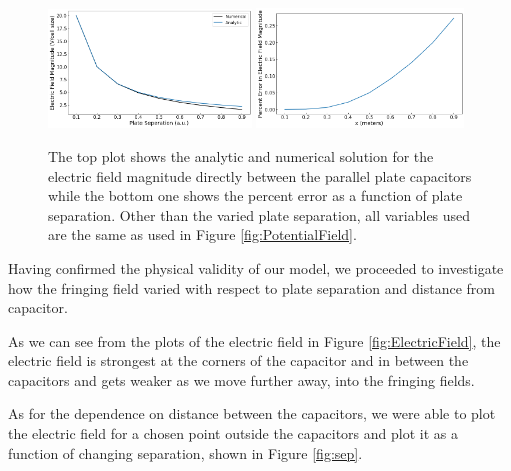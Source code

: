 \documentclass{report}
\begin{document}
            \begin{figure}[t]
                \centering
                \includegraphics[width=0.48\textwidth]{images/NumericalAnalytic.png}
                \includegraphics[width=0.49\textwidth]{images/PercentErrorSep.png}
                \caption{The top plot shows the analytic and numerical solution for the electric field magnitude directly between the parallel plate capacitors while the bottom one shows the percent error as a function of plate separation. Other than the varied plate separation, all variables used are the same as used in Figure \ref{fig:PotentialField}.}
                \label{fig:compare}
            \end{figure}
            
            Having confirmed the physical validity of our model, we proceeded to investigate how the fringing field varied with respect to plate separation and distance from capacitor.
        
            As we can see from the plots of the electric field in Figure \ref{fig:ElectricField}, the electric field is strongest at the corners of the capacitor and in between the capacitors and gets weaker as we move further away, into the fringing fields. 
            
            As for the dependence on distance between the capacitors, we were able to plot the electric field for a chosen point outside the capacitors and plot it as a function of changing separation, shown in Figure \ref{fig:sep}.
            
\end{document}
